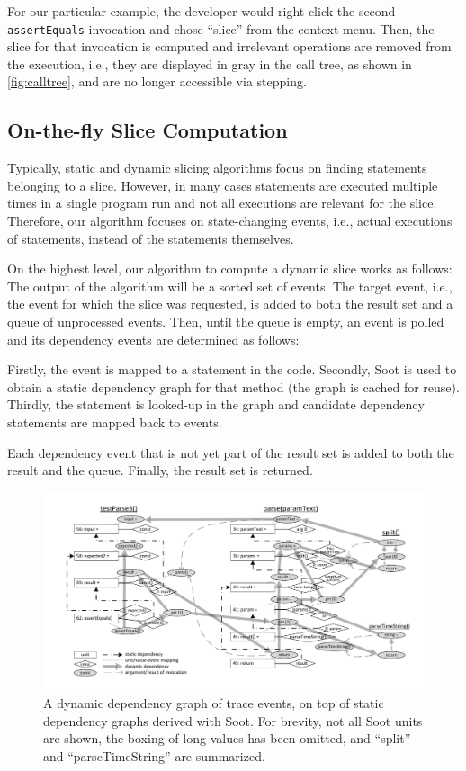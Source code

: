 \documentclass[english]{scrartcl}
\begin{document}
For our particular example, the developer would right-click the second \verb+assertEquals+ invocation and chose ``slice'' from the context menu.
Then, the slice for that invocation is computed and irrelevant operations are removed from the execution, i.e., they are displayed in gray in the call tree, as shown in \autoref{fig:calltree}, and are no longer accessible via stepping.

\subsection{On-the-fly Slice Computation}


Typically, static and dynamic slicing algorithms focus on finding statements belonging to a slice.
However, in many cases statements are executed multiple times in a single program run and not all executions are relevant for the slice.
Therefore, our algorithm focuses on state-changing events, i.e., actual executions of statements, instead of the statements themselves.

On the highest level, our algorithm to compute a dynamic slice works as follows:
The output of the algorithm will be a sorted set of events.
The target event, i.e., the event for which the slice was requested, is added to both the result set and a queue of unprocessed events.
Then, until the queue is empty, an event is polled and its dependency events are determined as follows:

Firstly, the event is mapped to a statement in the code.
Secondly, Soot is used to obtain a static dependency graph for that method (the graph is cached for reuse).
Thirdly, the statement is looked-up in the graph and candidate dependency statements are mapped back to events.

Each dependency event that is not yet part of the result set is added to both the result and the queue.
Finally, the result set is returned.

\begin{figure}[t]
\centering
\includegraphics[width=.99\linewidth, clip, trim=12mm 7mm 8mm 7mm]{img/graph}
\caption{A dynamic dependency graph of trace events, on top of static dependency graphs derived with Soot. For brevity, not all Soot units are shown, the boxing of long values has been omitted, and ``split'' and ``parseTimeString'' are summarized.}
\label{fig:graph}
\end{figure}
\end{document}
